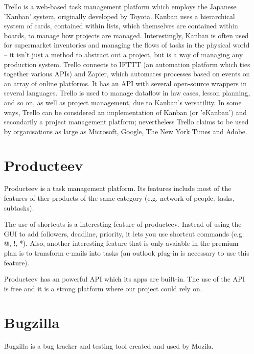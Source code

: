 \documentclass{l3proj}
\begin{document}
Trello is a web-based task management platform which employs the Japanese 'Kanban'
system, originally developed by Toyota. Kanban uses a hierarchical system of
cards, contained within lists, which themselves are contained within boards, to
manage how projects are managed. Interestingly, Kanban is often used for
supermarket inventories and managing the flows of tasks in the physical world --
it isn't just a method to abstract out a project, but is a way of managing any
production system.
Trello connects to IFTTT (an automation platform which ties together various APIs)
and Zapier, which automates processes based on events on an array of online
platforms. It has an API with several open-source wrappers in several languages.
Trello is used to manage dataflow in law cases, lesson planning, and so on, as
well as project management, due to Kanban's versatility.
In some ways, Trello can be considered an implementation of Kanban (or 'eKanban')
and secondarily a project management platform; nevertheless Trello claims to be
used by organisations as large as Microsoft, Google, The New York Times and
Adobe. 


\section{Producteev}
\label{producteev}

Producteev is a task management platform. Its features include most of the features of ther products of the same category (e.g. network of people, tasks, subtasks).

The use of shortcuts is a interesting feature of producteev. Instead of using the GUI to add followers, deadline, priority, it lets you use shortcut commands (e.g. @, !, *). Also, another interesting feature that is only avaiable in the premium plan is to transform e-mails into tasks (an outlook plug-in is necessary to use this feature).

Producteev has an powerful API which its apps are built-in. The use of the API is free and it is a strong platform where our project could rely on.


\section{Bugzilla}
\label{Bugzilla}

Bugzilla is a bug tracker and testing tool created and used by Mozila.
\end{document}
